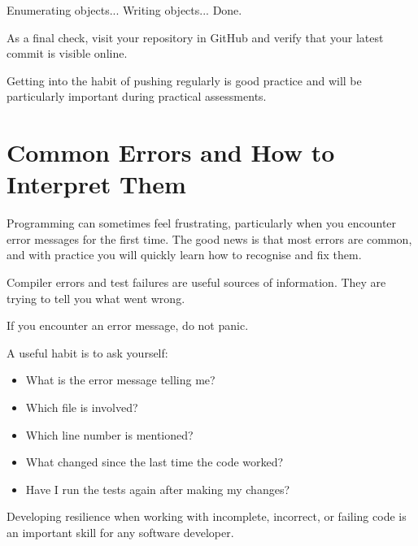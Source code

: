 \documentclass{csc2059practical}
\begin{document}
\begin{terminal}
Enumerating objects...
Writing objects...
Done.
\end{terminal}

As a final check, visit your repository in GitHub and verify that your latest commit is visible online.

\begin{importantnote}
Getting into the habit of pushing regularly is good practice and will be particularly important during practical assessments.
\end{importantnote}

\section{Common Errors and How to Interpret Them}

Programming can sometimes feel frustrating, particularly when you encounter error messages for the first time. The good news is that most errors are common, and with practice you will quickly learn how to recognise and fix them.

Compiler errors and test failures are useful sources of information. They are trying to tell you what went wrong.

\begin{reflectionbox}
If you encounter an error message, do not panic.

A useful habit is to ask yourself:

\begin{itemize}
  \item What is the error message telling me?
  \item Which file is involved?
  \item Which line number is mentioned?
  \item What changed since the last time the code worked?
  \item Have I run the tests again after making my changes?
\end{itemize}

Developing resilience when working with incomplete, incorrect, or failing code is an important skill for any software developer.
\end{reflectionbox}
\end{document}
